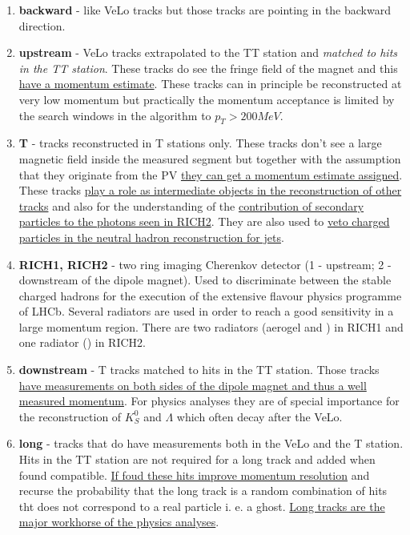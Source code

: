 \documentclass[11pt,a4paper,twoside]{article}
\begin{document}
\begin{enumerate}
\begin{enumerate}
            \item \textbf{backward} - like VeLo tracks but those tracks are pointing in the backward direction.
            
            \item \textbf{upstream} - VeLo tracks extrapolated to the TT station and \textit{matched to hits in the TT station}. These tracks do see the fringe field of the magnet and this \underline{have a momentum estimate}. These tracks can in principle be reconstructed at very low momentum but practically the momentum acceptance is limited by the search windows in the algorithm to $p_T > 200 MeV$.
            
            \item \textbf{T} - tracks reconstructed in T stations only. These tracks don't see a large magnetic field inside the measured segment but together with the assumption that they originate from the PV \underline{they can get a momentum estimate assigned}. These tracks \underline{play a role as intermediate objects in the reconstruction of other tracks} and also for the understanding of the \underline{contribution of secondary particles to the photons seen in RICH2}. They are also used to \underline{veto charged particles in the neutral hadron reconstruction for jets}.

            \item \textbf{RICH1, RICH2} - two ring imaging Cherenkov detector (1 - upstream; 2 - downstream of the dipole magnet). Used to discriminate between the stable charged hadrons for the execution of the extensive flavour physics programme of LHCb. Several radiators are used in order to reach a good sensitivity in a large momentum region. There are two radiators (aerogel and  ) in RICH1 and one radiator () in RICH2.
            
            \item \textbf{downstream} - T tracks matched to hits in the TT station. Those tracks \underline{have measurements on both sides of the dipole magnet and thus a well measured momentum}. For physics analyses they are of special importance for the reconstruction of $K^{0}_{S}$ and $\Lambda$ which often decay after the VeLo.
            
            \item \textbf{long} - tracks that do have measurements both in the VeLo and the T station. Hits in the TT station are not required for a long track and added when found compatible. \underline{If foud these hits improve momentum resolution} and recurse the probability that the long track is a random combination of hits tht does not correspond to a real particle i. e. a ghost. \underline{Long tracks are the major workhorse of the physics analyses}.
            

\end{enumerate}
\end{enumerate}
\end{document}

